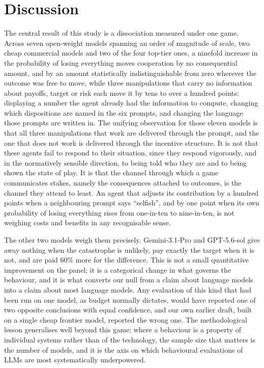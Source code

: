 \documentclass[openacc]{rsproca_new}
\begin{document}
\section{Discussion}
\label{sec:discussion}

The central result of this study is a dissociation measured under one game. Across seven open-weight models spanning an order of magnitude of scale, two cheap commercial models and two of the four top-tier ones, a ninefold increase in the probability of losing everything moves cooperation by no consequential amount, and by an amount statistically indistinguishable from zero wherever the outcome was free to move, while three manipulations that carry no information about payoffs, target or risk each move it by tens to over a hundred points: displaying a number the agent already had the information to compute, changing which dispositions are named in the six prompts, and changing the language those prompts are written in. The unifying observation for those eleven models is that all three manipulations that work are delivered through the prompt, and the one that does not work is delivered through the incentive structure. It is not that these agents fail to respond to their situation, since they respond vigorously, and in the normatively sensible direction, to being told who they are and to being shown the state of play. It is that the channel through which a game communicates stakes, namely the consequences attached to outcomes, is the channel they attend to least. An agent that adjusts its contribution by a hundred points when a neighbouring prompt says ``selfish'', and by one point when its own probability of losing everything rises from one-in-ten to nine-in-ten, is not weighing costs and benefits in any recognisable sense.

The other two models weigh them precisely. Gemini-3.1-Pro and GPT-5.6-sol give away nothing when the catastrophe is unlikely, pay exactly the target when it is not, and are paid $60\%$ more for the difference. This is not a small quantitative improvement on the panel; it is a categorical change in what governs the behaviour, and it is what converts our null from a claim about language models into a claim about most language models. Any evaluation of this kind that had been run on one model, as budget normally dictates, would have reported one of two opposite conclusions with equal confidence, and our own earlier draft, built on a single cheap frontier model, reported the wrong one. The methodological lesson generalises well beyond this game: where a behaviour is a property of individual systems rather than of the technology, the sample size that matters is the number of models, and it is the axis on which behavioural evaluations of LLMs are most systematically underpowered.
\end{document}
